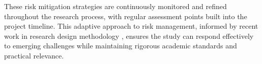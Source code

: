 These risk mitigation strategies are continuously monitored and refined throughout the research process, with regular assessment points built into the project timeline. This adaptive approach to risk management, informed by recent work in research design methodology \parencite{creswell2017}, ensures the study can respond effectively to emerging challenges while maintaining rigorous academic standards and practical relevance. 